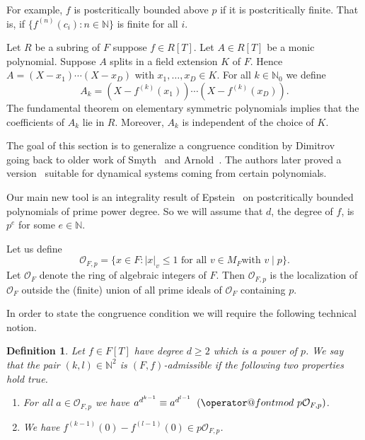 \documentclass[12pt,oneside,a4]{amsart}
\makeatletter
\newcommand{\IN}{\mathbb{N}}
\newcommand{\cO}{\mathcal{O}}
\newcounter{maincounter}
\numberwithin{maincounter}{section}
\numberwithin{equation}{section}
\newtheorem{defi}[maincounter]{Definition}
\def\imod#1{\allowbreak\mkern10mu({\operator@font mod}\,\,#1)}
\makeatother
\begin{document}
For example, $f$ is postcritically bounded above $p$ if it is
postcritically finite. That is, if $\{f^{(n)}(c_i):n\in\IN\}$ is
finite for all $i$.

Let $R$ be a subring of $F$ suppose $f\in R[T]$.
Let $A\in R[T]$ be a monic polynomial.
Suppose $A$ splits in a field extension $K$ of $F$.
Hence $A=(X-x_1) \cdots (X-x_D)$ with $x_1,\dots,x_D\in K$. For all
$k\in\IN_0$ we define
\begin{equation}
  \label{def:Ak}
  A_k = (X-f^{(k)}(x_1))\cdots (X-f^{(k)}(x_D)).
\end{equation}
The fundamental theorem on elementary symmetric polynomials implies
that the coefficients of $A_k$ lie in $R$. Moreover, $A_k$ is
independent of the choice of $K$.

The goal of this section is to generalize a congruence
condition by Dimitrov~\cite{dimitrov:SZ} going back to older work of
Smyth~\cite{smyth:coloringproof} and Arnold~\cite{arnold:eulerfermat}.
The authors later proved a  version~\cite{hs:2021lower} suitable for
 dynamical systems coming from certain polynomials. 

Our main new tool is an integrality result of
Epstein~\cite{epstein:12} on postcritically bounded
polynomials of prime power degree. So we will assume that $d$, the
degree of $f$, is $p^e$ for some $e\in\IN$. 

Let us define
\begin{equation}
  \label{def:OFp}
  \cO_{F,p} = \{x\in F : |x|_v\le 1 \text{ for all }v\in M_F\text{
    with }v\mid p\}.
\end{equation}
Let $\cO_F$ denote the ring of algebraic integers of $F$. 
Then $\cO_{F,p}$ is the localization of 
$\cO_F$  outside the (finite) union of all
prime ideals of $\cO_F$ containing $p$.

In order to state the congruence condition we will require the
following technical notion. 

\begin{defi}
  \label{def:Ffadmissible}
  Let $f\in F[T]$ have degree $d\ge 2$ which is a power of $p$.
  We say that the pair $(k,l)\in\IN^2$ is $(F,f)$-admissible if
  the following two properties hold true.
  \begin{enumerate}
  \item [(i)] For all $a\in \cO_{F,p}$ we have $a^{d^{k-1}} \equiv
    a^{d^{l-1}}\imod {p\cO_{F,p}}$.
  \item[(ii)] We have $f^{(k-1)}(0) - f^{(l-1)}(0) \in p\cO_{F,p}$. 
  \end{enumerate}
\end{defi}
\end{document}
